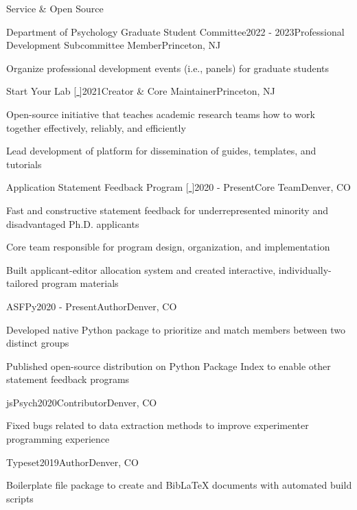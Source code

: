 \documentclass{cv} %
\begin{document}
\begin{cvSection}{Service \& Open Source}
\begin{cvSubsectionWork}{Department of Psychology Graduate Student Committee}{2022 - 2023}{Professional Development Subcommittee Member}{Princeton, NJ}
\item Organize professional development events (i.e., panels) for graduate students
\end{cvSubsectionWork}

\begin{cvSubsectionWork}{Start Your Lab [\href{https://www.startyourlab.com/}{ }]}{2021}{Creator \& Core Maintainer}{Princeton, NJ}
\item Open-source initiative that teaches academic research teams how to work together effectively, reliably, and efficiently
\item Lead development of platform for dissemination of guides, templates, and tutorials
\end{cvSubsectionWork}

\begin{cvSubsectionWork}{Application Statement Feedback Program [\href{https://www.asfp.io/}{ }]}{2020 - Present}{Core Team}{Denver, CO}
\item Fast and constructive statement feedback for underrepresented minority and disadvantaged Ph.D. applicants
\item Core team responsible for program design, organization, and implementation
\item Built applicant-editor allocation system and created interactive, individually-tailored program materials
\end{cvSubsectionWork}

\begin{cvSubsectionWork}{ASFPy}{2020 - Present}{Author}{Denver, CO}
\item Developed native Python package  to prioritize and match members between two distinct groups
\item Published open-source distribution on Python Package Index to enable other statement feedback programs
\end{cvSubsectionWork}

\begin{cvSubsectionWork}{jsPsych}{2020}{Contributor}{Denver, CO}
\item Fixed bugs related to  data extraction methods to improve experimenter programming experience
\end{cvSubsectionWork}

\begin{cvSubsectionWork}{Typeset}{2019}{Author}{Denver, CO}
\item Boilerplate file package  to create \LaTeXe{} and Bib\LaTeX{} documents with automated build scripts
\end{cvSubsectionWork}
\end{cvSection}
\end{document}
